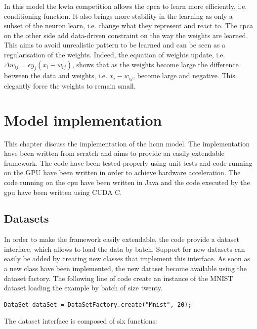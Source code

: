 \documentclass[11pt]{report}
\begin{document}
\noindent In this model the \acrshort{kwta} competition allows the \acrshort{cpca} to learn more efficiently, i.e. conditioning function. It also brings more stability in the learning as only a subset of the neuron learn, i.e. change what they represent and react to. The \acrshort{cpca} on the other side add data-driven constraint on the way the weights are learned. This aims to avoid unrealistic pattern to be learned and can be seen as a regularisation of the weights. Indeed, the equation of weights update, i.e. $\Delta w_{ij} = \epsilon y_j (x_i - w_{ij})$, shows that as the weights become large the difference between the data and weights, i.e. $x_i - w_{ij}$, become large and negative. This elegantly force the weights to remain small.

\chapter{Model implementation} \label{model_implementation}

This chapter discuss the implementation of the \acrshort{hcnn} model. The implementation have been written from scratch and aims to provide an easily extendable framework. The code have been tested properly using unit tests and code running on the GPU have been written in order to achieve hardware acceleration. The code running on the \acrshort{cpu} have been written in Java and the code executed by the \acrshort{gpu} have been written using CUDA C.

\section{Datasets}

In order to make the framework easily extendable, the code provide a dataset interface, which allows to load the data by batch. Support for new datasets can easily be added by creating new classes that implement this interface. As soon as a new class have been implemented, the new dataset become available using the dataset factory. The following line of code create an instance of the MNIST dataset loading the example by batch of size twenty.

\begin{verbatim}
DataSet dataSet = DataSetFactory.create("Mnist", 20);
\end{verbatim}

\noindent The dataset interface is composed of six functions:
\end{document}
